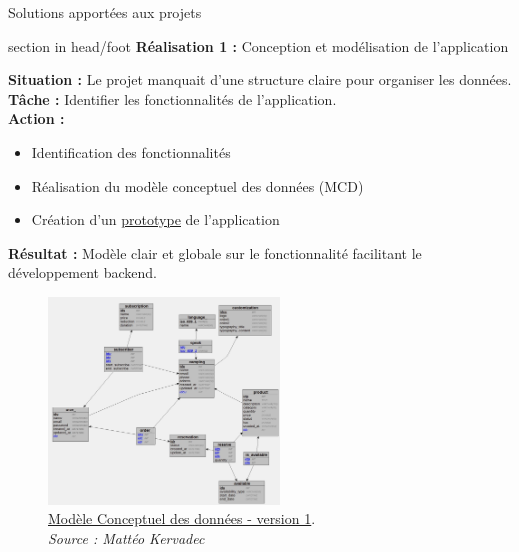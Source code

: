 \documentclass{beamer}
\begin{document}
\begin{frame}[label=realisation]{Solutions apportées aux projets}
	\begin{beamercolorbox}[wd=\paperwidth,ht=1.5em,dp=0.5em,leftskip=0.5cm]{section in head/foot}
  		\large \textbf{Réalisation 1 :} \normalsize Conception et modélisation de l'application
	\end{beamercolorbox}
	\vspace{0.5em}

	\begin{center}
  		 {
  			\begin{minipage}{0.9\textwidth}
  				\textbf{Situation :} Le projet manquait d’une structure claire pour organiser les données.\\
  				\textbf{Tâche :} Identifier les fonctionnalités de l'application.\\
  				\textbf{Action :}
  			  		\begin{itemize}
  						\item Identification des fonctionnalités
  						\item Réalisation du modèle conceptuel des données (MCD)
  						\item Création d'un \href{https://www.figma.com/design/GuunRMUtzwJjCk1OudcjYl/Pain-Pizza?node-id=0-1&p=f&t=KjBsRt1nqpntIccn-0}{\underline{prototype}} de l'application
  					\end{itemize}
				\textbf{Résultat :} Modèle clair et globale sur le fonctionnalité facilitant le développement backend.
			\end{minipage}
		}
		\only<2> {
			\begin{figure}[t]
  				\includegraphics[height=5.5cm]{../img/conception/mcd_V1.jpg}
				\caption{	
					\centering			
  					\href{https://github.com/Matteo-K/Soutenance_E-delic/blob/main/img/conception/mcd_V1.jpg}{\underline{Modèle Conceptuel des données - version 1}}.\\
  					\textit{Source : Mattéo Kervadec}
}
\end{figure}}
\end{center}
\end{frame}
\end{document}
